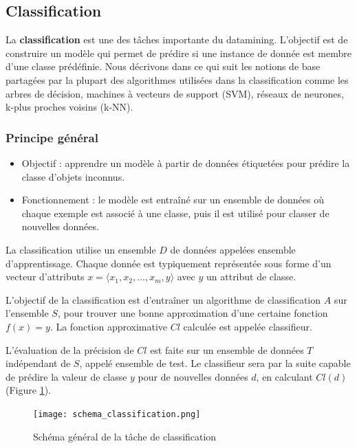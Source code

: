 \documentclass[a4paper,12pt]{report}
\begin{document}
        \subsection{Classification}
        
        La \textbf{classification} est une des tâches importante du datamining. L’objectif est de construire un modèle qui permet de prédire si une instance de donnée est membre d’une classe prédéfinie.  Nous décrivons dans ce qui suit les notions de base partagées par la plupart des algorithmes utilisées dans la classification comme les arbres de décision, machines à vecteurs de support (SVM), réseaux de neurones, k-plus proches voisins (k-NN).

        \subsubsection{Principe général}


            \begin{itemize}
                \item  Objectif : apprendre un modèle à partir de données étiquetées pour prédire la classe d’objets inconnus.
                \item  Fonctionnement : le modèle est entraîné sur un ensemble de données où chaque exemple est associé à une classe, puis il est utilisé pour classer de nouvelles données.\\
            \end{itemize}
            La classification utilise un ensemble $D$ de données appelées ensemble d’apprentissage. Chaque donnée est typiquement représentée sous forme d’un vecteur d’attributs 
            $x = \langle x_1, x_2, \dots, x_m, y \rangle$ avec $y$ un attribut de classe. 
            
            L’objectif de la classification est d’entraîner un algorithme de classification $A$ sur l’ensemble $S$, pour trouver une bonne approximation d’une certaine fonction $f(x) = y$. La fonction approximative $Cl$ calculée est appelée classifieur. 
            
            L’évaluation de la précision de $Cl$ est faite sur un ensemble de données $T$ indépendant de $S$, appelé ensemble de test. Le classifieur sera par la suite capable de prédire la valeur de classe $y$ pour de nouvelles données $d$, en calculant $Cl(d)$ (Figure \ref{fig:classification}).
            
            \begin{figure}[h]
                \centering
                \texttt{[image: schema\_classification.png]}
                \caption{Schéma général de la tâche de classification}
                \label{fig:classification}
            \end{figure}
        
\end{document}

